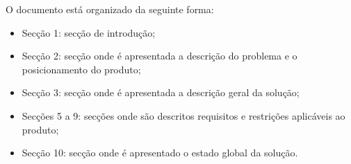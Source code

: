 O documento está organizado da seguinte forma:
\begin{itemize}
	\item Secção 1: secção de introdução;
	\item Secção 2: secção onde é apresentada a descrição do problema e o posicionamento do produto;
	\item Secção 3: secção onde é apresentada a descrição geral da solução;
	\item Secções 5 a 9: secções onde são descritos requisitos e restrições aplicáveis ao produto;
	\item Secção 10: secção onde é apresentado o estado global da solução.
\end{itemize}

\clearpage